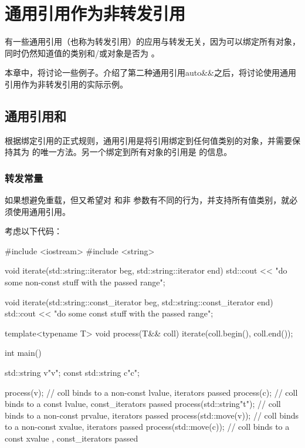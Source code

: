 \section{通用引用作为非转发引用}
有一些通用引用（也称为转发引用）的应用与转发无关，因为可以绑定所有对象，同时仍然知道值的类别和/或对象是否为 。

本章中，将讨论一些例子。介绍了第二种通用引用auto\&\&之后，将讨论使用通用引用作为非转发引用的实际示例。

\subsection{通用引用和 }

根据绑定引用的正式规则，通用引用是将引用绑定到任何值类别的对象，并需要保持其为  的唯一方法。另一个绑定到所有对象的引用是  的信息。

\subsubsection{转发常量}

如果想避免重载，但又希望对  和非  参数有不同的行为，并支持所有值类别，就必须使用通用引用。

考虑以下代码：

\begin{cppcode}
#include <iostream>
#include <string>

void iterate(std::string::iterator beg, std::string::iterator end)
{
	std::cout << "do some non-const stuff with the passed range\n";
}

void iterate(std::string::const_iterator beg, std::string::const_iterator end)
{
	std::cout << "do some const stuff with the passed range\n";
}

template<typename T>
void process(T&& coll)
{
	iterate(coll.begin(), coll.end());
}

int main()
{
	std::string v{"v"};
	const std::string c{"c"};

	process(v); // coll binds to a non-const lvalue, iterators passed
	process(c); // coll binds to a const lvalue, const_iterators passed
	process(std::string{"t"}); // coll binds to a non-const prvalue, iterators passed
	process(std::move(v)); // coll binds to a non-const xvalue, iterators passed
	process(std::move(c)); // coll binds to a const xvalue , const_iterators passed
}
\end{cppcode}

